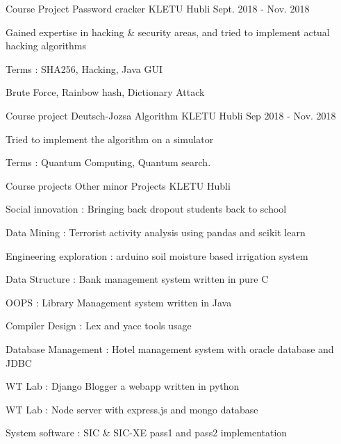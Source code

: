 \begin{cventries}

\cventry
{Course Project} %
{Password cracker} %
{KLETU Hubli} %
{Sept. 2018 - Nov. 2018} %
{ %
\begin{cvitems}
\item {Gained expertise in hacking \& security areas, and tried to implement actual hacking algorithms}
\item {Terms : SHA256, Hacking, Java GUI}
\item {Brute Force, Rainbow hash, Dictionary Attack}
\end{cvitems}
}


\cventry
{Course project} %
{Deutsch-Jozsa Algorithm} %
{KLETU Hubli} %
{Sep 2018 - Nov. 2018} %
{ %
\begin{cvitems}
\item {Tried to implement the algorithm on a simulator}
\item {Terms : Quantum Computing, Quantum search.}
\end{cvitems}
}

\cventry
{Course projects} %
{Other minor Projects} %
{KLETU Hubli} %
{} %
{ %
\begin{cvitems}
\item {Social innovation	: Bringing back dropout students back to school}
\item {Data Mining	: Terrorist activity analysis using  pandas and scikit learn}
\item {Engineering exploration	: arduino soil moisture based irrigation system}
\item {Data Structure	: Bank management system written in pure C}
\item {OOPS	: Library Management system written in Java}
\item {Compiler Design	: Lex and yacc tools usage}
\item {Database Management	: Hotel management system with oracle database and JDBC}
\item {WT Lab	: Django Blogger a webapp written in python}
\item {WT Lab	: Node server with express.js and mongo database}
\item {System software	: SIC \& SIC-XE pass1 and pass2 implementation}
\end{cvitems}
}


\end{cventries}
